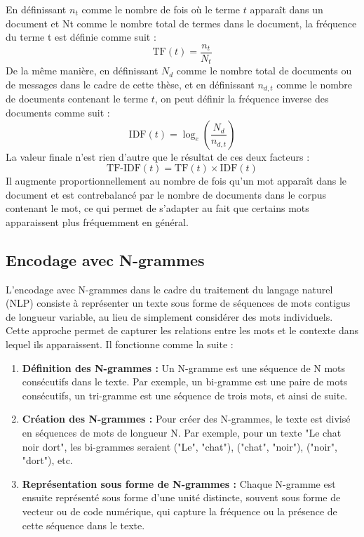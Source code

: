 En définissant $n_t$ comme le nombre de fois où le terme $t$ apparaît dans un document et Nt comme le nombre total de termes dans le document, la fréquence du terme t est définie comme suit :
\begin{equation}
\text{TF}(t) = \frac{n_t}{N_t}
\end{equation}
De la même manière, en définissant $N_d$ comme le nombre total de documents ou de messages dans le cadre de cette thèse, et en définissant $n_{d,t}$ comme le nombre de documents contenant le terme $t$, on peut définir la fréquence inverse des documents comme suit :
\begin{equation}  
\text{IDF}(t) = \log_e\left(\frac{N_d}{n_{d,t}}\right)
\end{equation}
La valeur finale n'est rien d'autre que le résultat de ces deux facteurs :
\begin{equation}
\text{TF-IDF}(t) = \text{TF}(t) \times \text{IDF}(t)
\end{equation}
Il augmente proportionnellement au nombre de fois qu'un mot apparaît dans le document et est contrebalancé par le nombre de documents dans le corpus contenant le mot, ce qui permet de s'adapter au fait que certains mots apparaissent plus fréquemment en général.


\subsection{Encodage avec N-grammes}
L'encodage avec N-grammes dans le cadre du traitement du langage naturel (NLP) consiste à représenter un texte sous forme de séquences de mots contigus de longueur variable, au lieu de simplement considérer des mots individuels. Cette approche permet de capturer les relations entre les mots et le contexte dans lequel ils apparaissent. Il fonctionne comme la suite :

\begin{enumerate}
    \item \textbf{Définition des N-grammes :} Un N-gramme est une séquence de N mots consécutifs dans le texte. Par exemple, un bi-gramme est une paire de mots consécutifs, un tri-gramme est une séquence de trois mots, et ainsi de suite.
    
    \item \textbf{Création des N-grammes :} Pour créer des N-grammes, le texte est divisé en séquences de mots de longueur N. Par exemple, pour un texte "Le chat noir dort", les bi-grammes seraient ("Le", "chat"), ("chat", "noir"), ("noir", "dort"), etc.
    
    \item \textbf{Représentation sous forme de N-grammes :} Chaque N-gramme est ensuite représenté sous forme d'une unité distincte, souvent sous forme de vecteur ou de code numérique, qui capture la fréquence ou la présence de cette séquence dans le texte.
\end{enumerate}

